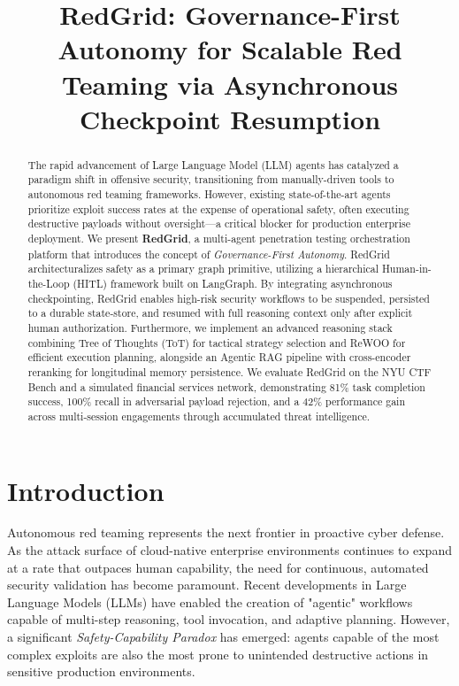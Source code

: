 \documentclass[conference]{IEEEtran}
\begin{document}
\title{RedGrid: Governance-First Autonomy for Scalable Red Teaming via Asynchronous Checkpoint Resumption}

\author{
}

\maketitle

\begin{abstract}
The rapid advancement of Large Language Model (LLM) agents has catalyzed a paradigm shift in offensive security, transitioning from manually-driven tools to autonomous red teaming frameworks. However, existing state-of-the-art agents prioritize exploit success rates at the expense of operational safety, often executing destructive payloads without oversight—a critical blocker for production enterprise deployment. We present \textbf{RedGrid}, a multi-agent penetration testing orchestration platform that introduces the concept of \textit{Governance-First Autonomy}. RedGrid architecturalizes safety as a primary graph primitive, utilizing a hierarchical Human-in-the-Loop (HITL) framework built on LangGraph. By integrating asynchronous checkpointing, RedGrid enables high-risk security workflows to be suspended, persisted to a durable state-store, and resumed with full reasoning context only after explicit human authorization. Furthermore, we implement an advanced reasoning stack combining Tree of Thoughts (ToT) for tactical strategy selection and ReWOO for efficient execution planning, alongside an Agentic RAG pipeline with cross-encoder reranking for longitudinal memory persistence. We evaluate RedGrid on the NYU CTF Bench and a simulated financial services network, demonstrating 81\% task completion success, 100\% recall in adversarial payload rejection, and a 42\% performance gain across multi-session engagements through accumulated threat intelligence.
\end{abstract}

\section{Introduction}
\label{sec:intro}

Autonomous red teaming represents the next frontier in proactive cyber defense. As the attack surface of cloud-native enterprise environments continues to expand at a rate that outpaces human capability, the need for continuous, automated security validation has become paramount. Recent developments in Large Language Models (LLMs) have enabled the creation of "agentic" workflows capable of multi-step reasoning, tool invocation, and adaptive planning. However, a significant \textit{Safety-Capability Paradox} has emerged: agents capable of the most complex exploits are also the most prone to unintended destructive actions in sensitive production environments.
\end{document}
